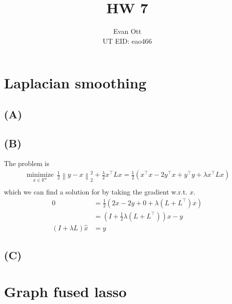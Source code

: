 \documentclass{article}
\title{\vspace{-6ex}HW 7\vspace{-2ex}}
\author{Evan Ott \\ UT EID: eao466\vspace{-2ex}}
\newcommand{\op}[2]{{\ensuremath{\underset{ #2 }{\operatorname{ #1 }}~}}}
\newcommand{\norm}[1]{{ \ensuremath{ \left\lVert  #1 \right\rVert  }  }}
\begin{document}
\maketitle

\section{Laplacian smoothing}

\subsection{(A)}

\subsection{(B)}
The problem is
\begin{align*}
\op{minimize}{x\in \mathbb{R}^n} \frac{1}{2}\norm{y-x}_2^2 + \frac{\lambda}{2}x^\top L x=\frac{1}{2}\left(x^\top x - 2y^\top x + y^\top y + \lambda x^\top L x\right)\\
\end{align*}
which we can find a solution for by taking the gradient w.r.t. $x$.
\begin{align*}
0&=\frac{1}{2}\left(2x - 2y + 0 + \lambda (L + L^\top) x\right)\\
&= \left(I + \frac{1}{2}\lambda (L + L^\top)\right)x - y\\
\left(I + \lambda L\right)\hat{x}  &= y
\end{align*}

\subsection{(C)}

\section{Graph fused lasso}



\end{document}
